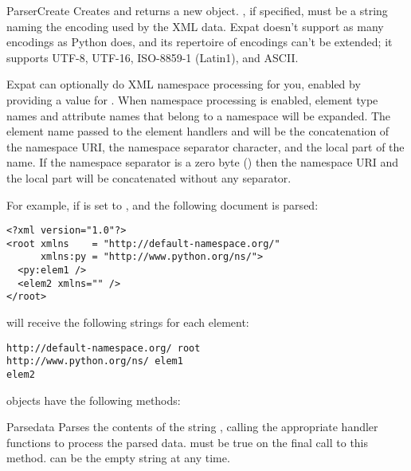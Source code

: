 \begin{funcdesc}{ParserCreate}{}
Creates and returns a new  object.  
, if specified, must be a string naming the encoding 
used by the XML data.  Expat doesn't support as many encodings as
Python does, and its repertoire of encodings can't be extended; it
supports UTF-8, UTF-16, ISO-8859-1 (Latin1), and ASCII.  

Expat can optionally do XML namespace processing for you, enabled by
providing a value for .  When namespace
processing is enabled, element type names and attribute names that
belong to a namespace will be expanded.  The element name 
passed to the element handlers 
 and 
will be the concatenation of the namespace URI, the namespace
separator character, and the local part of the name.  If the namespace
separator is a zero byte () 
then the namespace URI and the local part will be
concatenated without any separator. 

For example, if  is set to 
\samp{ }, and the following document is parsed:

\begin{verbatim}
<?xml version="1.0"?>
<root xmlns    = "http://default-namespace.org/"
      xmlns:py = "http://www.python.org/ns/">
  <py:elem1 />
  <elem2 xmlns="" />
</root>
\end{verbatim}

 will receive the following strings for each element: 

\begin{verbatim}
http://default-namespace.org/ root
http://www.python.org/ns/ elem1
elem2
\end{verbatim}

\end{funcdesc}

 objects have the following methods:

\begin{methoddesc}{Parse}{data }
Parses the contents of the string , calling the appropriate
handler functions to process the parsed data.   must be
true on the final call to this method.     can be the empty
string at any time.
\end{methoddesc}

